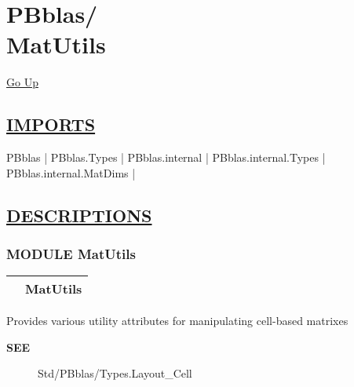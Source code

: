 \chapter*{\color{headfile}
{\large PBblas\slash\hspace{0pt}}
 \\
MatUtils
}
\hypertarget{ecldoc:toc:PBblas.MatUtils}{}
\hyperlink{ecldoc:toc:root/PBblas}{Go Up}

\section*{\underline{\textsf{IMPORTS}}}
\begin{doublespace}
{\large
PBblas |
PBblas.Types |
PBblas.internal |
PBblas.internal.Types |
PBblas.internal.MatDims |
}
\end{doublespace}

\section*{\underline{\textsf{DESCRIPTIONS}}}
\subsection*{\textsf{\colorbox{headtoc}{\color{white} MODULE}
MatUtils}}

\hypertarget{ecldoc:PBblas.MatUtils}{}

{\renewcommand{\arraystretch}{1.5}
\begin{tabularx}{\textwidth}{|>{\raggedright\arraybackslash}l|X|}
\hline
\hspace{0pt}\mytexttt{\color{red} } & \textbf{MatUtils} \\
\hline
\end{tabularx}
}

\par





Provides various utility attributes for manipulating cell-based matrixes










\par
\begin{description}
\item [\colorbox{tagtype}{\color{white} \textbf{\textsf{SEE}}}] Std/PBblas/Types.Layout\_Cell
\end{description}



